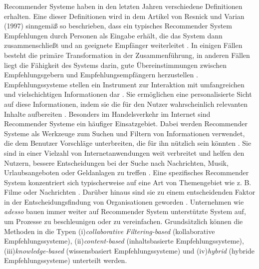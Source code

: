 Recommender Systeme haben in den letzten Jahren verschiedene Definitionen erhalten. Eine dieser Definitionen wird in dem Artikel von Resnick und Varian (1997) sinngemäß so beschrieben, dass ein typisches Recommender System Empfehlungen durch Personen als Eingabe erhält, die das System dann zusammenschließt und an geeignete Empfänger weiterleitet \cite{burke2011recommender}. In einigen Fällen besteht die primäre Transformation in der Zusammenführung, in anderen Fällen liegt die Fähigkeit des Systems darin, gute Übereinstimmungen zwischen Empfehlungsgebern und Empfehlungsempfängern herzustellen \cite{burke2011recommender}. Empfehlungssysteme stellen ein Instrument zur Interaktion mit umfangreichen und vielschichtigen Informationen dar \cite{burke2011recommender}. Sie ermöglichen eine personalisierte Sicht auf diese Informationen, indem sie die für den Nutzer wahrscheinlich relevanten Inhalte aufbereiten \cite{burke2011recommender}. Besonders im Handelsverkehr im Internet sind Recommender Systeme ein häufiger Einsatzgebiet. Dabei werden Recommender Systeme als Werkzeuge zum Suchen und Filtern von Informationen verwendet, die dem Benutzer Vorschläge unterbreiten, die für ihn nützlich sein könnten \cite{burke2011recommender}. Sie sind in einer Vielzahl von Internetanwendungen weit verbreitet und helfen den Nutzern, bessere Entscheidungen bei der Suche nach Nachrichten, Musik, Urlaubsangeboten oder Geldanlagen zu treffen \cite{ricci2014recommender}. Eine spezifisches Recommender System konzentriert sich typischerweise auf eine Art von Themengebiet wie z. B. Filme oder Nachrichten \cite{ricci2014recommender}. Darüber hinaus sind sie zu einem entscheidenden Faktor in der Entscheidungsfindung von Organisationen geworden \cite{chartron2014general}. Unternehmen wie \emph{adesso} bauen immer weiter auf Recommender System unterstützte System auf, um Prozesse zu beschleunigen oder zu vereinfachen. Grundsätzlich können die Methoden in die Typen (i)\emph{collaborative Filtering-based} (kollaborative Empfehlungssysteme), (ii)\emph{content-based} (inhaltsbasierte Empfehlungssysteme), (iii)\emph{knowledge-based} (wissensbasiert Empfehlungssysteme) und (iv)\emph{hybrid} (hybride Empfehlungssysteme) unterteilt werden.\\


